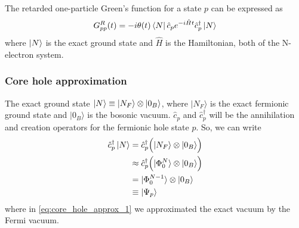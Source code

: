 

The retarded one-particle Green's function for a state $p$ can be expressed as 
\begin{equation}
G_{pp}^R(t) = -i \theta(t) \bra{N} \hat{c}_p e^{-i\hat{H} t} \hat{c}_p^\dagger \ket{N}
\end{equation}
where $\ket{N}$ is the exact ground state and $\hat{H}$ is the Hamiltonian, both of the N-electron system.
\subsubsection{Core hole approximation}
The exact ground state $\ket{N}\equiv |N_F\rangle \otimes |0_B\rangle$, where $|N_F\rangle$ is the exact fermionic ground state and $|0_B\rangle$ is the bosonic vacuum. $\hat{c}_p$ and $\hat{c}_p^\dagger$ will be the annihilation and creation operators for the fermionic hole state $p$. So, we can write
\begin{align}
\hat{c}_p^\dagger \ket{N} &= \hat{c}_p^\dagger \Bigl( |N_F\rangle \otimes |0_B\rangle \Bigr) \\
&\approx \hat{c}_p^\dagger \Bigl( |\Phi_0^N\rangle \otimes |0_B\rangle \Bigr)
\label{eq:core_hole_approx_1}\\
& = |\Phi_0^{N-1}\rangle \otimes |0_B\rangle \\
&\equiv \ket{\Psi_p}
\end{align}
where in \ref{eq:core_hole_approx_1} we approximated the exact vacuum by the Fermi vacuum.
